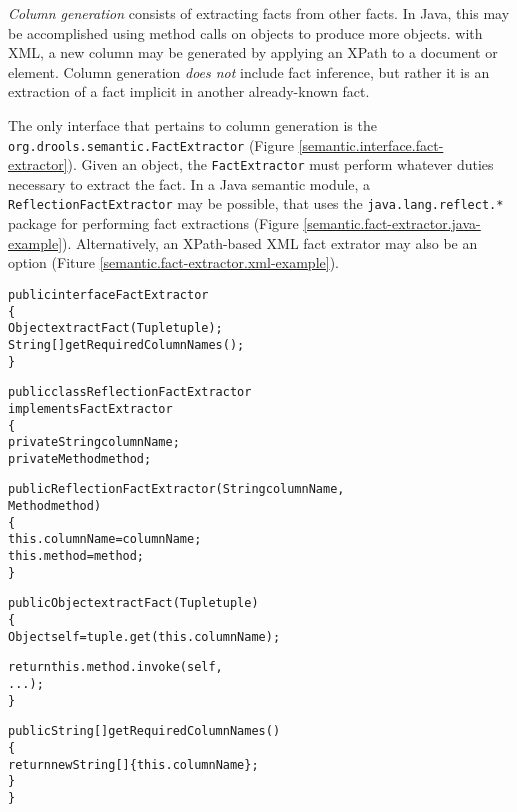 \documentclass[10pt,twocolumn,letterpaper]{article}
\newenvironment{codelisting}%
	{\begin{minipage}{250pt}\small\begin{alltt}}%
	{\end{alltt}\end{minipage}}
\begin{document}
\emph{Column generation} consists of extracting facts from other
facts.  In Java, this may be accomplished using method calls on
objects to produce more objects.  with XML, a new column may be
generated by applying an XPath to a document or element.  Column
generation \emph{does not} include fact inference, but rather
it is an extraction of a fact implicit in another already-known
fact.

The only interface that pertains to column generation is the
\verb|org.drools.semantic.FactExtractor| (Figure
\ref{semantic.interface.fact-extractor}).
Given an object, the \verb|FactExtractor| must perform whatever 
duties necessary to extract the fact. In a Java semantic module, a 
\verb|ReflectionFactExtractor| may be possible, that uses the
\verb|java.lang.reflect.*| package for performing fact 
extractions (Figure \ref{semantic.fact-extractor.java-example}).
Alternatively, an XPath-based XML fact extrator may also
be an option (Fiture \ref{semantic.fact-extractor.xml-example}).

\begin{figure*}[p]
	\begin{codelisting}
	public interface FactExtractor
	\{
	     Object extractFact(Tuple tuple);
	     String[] getRequiredColumnNames();
	\}
	\end{codelisting}
	\caption{The \emph{FactExtractor} interface.}
	\label{semantic.interface.fact-extractor}
\end{figure*}

\begin{figure*}[p]
	\begin{codelisting}
	public class ReflectionFactExtractor 
	             implements FactExtractor
	\{
	     private String columnName;
	     private Method method;

	     public ReflectionFactExtractor(String columnName,
	                                    Method method)
	     \{
	          this.columnName = columnName;
	          this.method     = method;
	     \}

	     public Object extractFact(Tuple tuple)
	     \{
	          Object self = tuple.get( this.columnName );

	          return this.method.invoke( self,
	                                     ... );
	     \}

	     public String[] getRequiredColumnNames()
	     \{
	          return new String[] \{ this.columnName \};
	     \}
	\}
	\end{codelisting}
	\caption{Example \emph{FactExtractor} implementing Java method semantics.}
	\label{semantic.fact-extractor.java-example}
\end{figure*}
\end{document}

